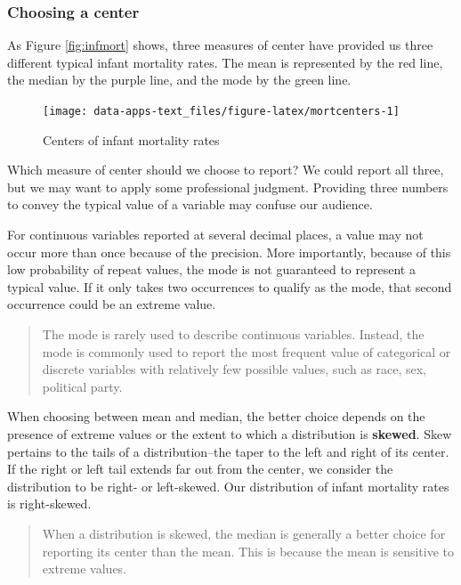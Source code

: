 \documentclass[
]{book}
\begin{document}
\hypertarget{choosing-a-center}{%
\subsubsection*{Choosing a center}\label{choosing-a-center}}


As Figure \ref{fig:infmort} shows, three measures of center have provided us three different typical infant mortality rates. The mean is represented by the red line, the median by the purple line, and the mode by the green line.

\begin{figure}

{\centering \texttt{[image: data-apps-text\_files/figure-latex/mortcenters-1]} 

}

\caption{Centers of infant mortality rates}\label{fig:mortcenters}
\end{figure}

Which measure of center should we choose to report? We could report all three, but we may want to apply some professional judgment. Providing three numbers to convey the typical value of a variable may confuse our audience.

For continuous variables reported at several decimal places, a value may not occur more than once because of the precision. More importantly, because of this low probability of repeat values, the mode is not guaranteed to represent a typical value. If it only takes two occurrences to qualify as the mode, that second occurrence could be an extreme value.

\begin{quote}
The mode is rarely used to describe continuous variables. Instead, the mode is commonly used to report the most frequent value of categorical or discrete variables with relatively few possible values, such as race, sex, political party.
\end{quote}

When choosing between mean and median, the better choice depends on the presence of extreme values or the extent to which a distribution is \textbf{skewed}. Skew pertains to the tails of a distribution--the taper to the left and right of its center. If the right or left tail extends far out from the center, we consider the distribution to be right- or left-skewed. Our distribution of infant mortality rates is right-skewed.

\begin{quote}
When a distribution is skewed, the median is generally a better choice for reporting its center than the mean. This is because the mean is sensitive to extreme values.
\end{quote}
\end{document}

